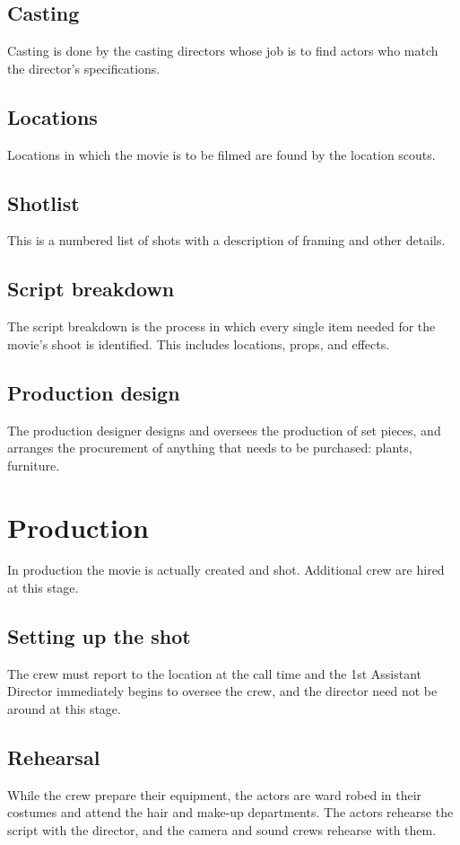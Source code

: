 \documentclass{article}
\begin{document}
\subsection{Casting}
Casting is done by the casting directors whose job is to find actors who match the director’s specifications.

\subsection{Locations}
Locations in which the movie is to be filmed are found by the location scouts.

\subsection{Shotlist}
This is a numbered list of shots with a description of framing and other details.

\subsection{Script breakdown}
The script breakdown is the process in which every single item needed for the movie’s shoot is identified. This includes locations, props, and effects.

\subsection{Production design}
The production designer designs and oversees the production of set pieces, and arranges the procurement of anything that needs to be purchased: plants, furniture.

\section{Production}
In production the movie is actually created and shot. Additional crew are hired at this stage.

\subsection{Setting  up the shot}
The crew must report to the location at the call time and the 1st Assistant Director immediately begins to oversee the crew, and the director need not be around at this stage.

\subsection{ Rehearsal}
While the crew prepare their equipment, the actors are ward robed in their costumes and attend the hair and make-up departments. The actors rehearse the script with the director, and the camera and sound crews rehearse with them.
\end{document}

